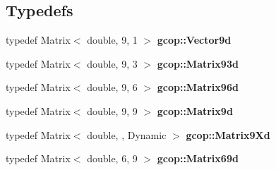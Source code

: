 \subsection*{\-Typedefs}
\begin{DoxyCompactItemize}
\item 
typedef \-Matrix$<$ double, 9, 1 $>$ {\bf gcop\-::\-Vector9d}
\item 
typedef \-Matrix$<$ double, 9, 3 $>$ {\bf gcop\-::\-Matrix93d}
\item 
typedef \-Matrix$<$ double, 9, 6 $>$ {\bf gcop\-::\-Matrix96d}
\item 
typedef \-Matrix$<$ double, 9, 9 $>$ {\bf gcop\-::\-Matrix9d}
\item 
typedef \-Matrix$<$ double, , \-Dynamic $>$ {\bf gcop\-::\-Matrix9\-Xd}
\item 
typedef \-Matrix$<$ double, 6, 9 $>$ {\bf gcop\-::\-Matrix69d}
\end{DoxyCompactItemize}
